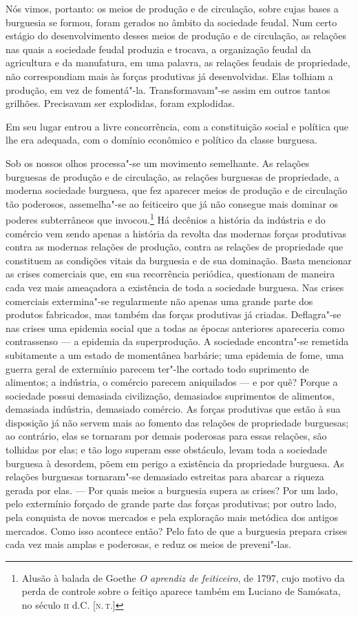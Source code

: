 Nós vimos, portanto: os meios de produção e de circulação, sobre cujas
bases a burguesia se formou, foram gerados no âmbito da sociedade
feudal. Num certo estágio do desenvolvimento desses meios de produção e
de circulação, as relações nas quais a sociedade feudal produzia e
trocava, a organização feudal da agricultura e da manufatura, em uma
palavra, as relações feudais de propriedade, não correspondiam mais às
forças produtivas já desenvolvidas. Elas tolhiam a produção, em vez de
fomentá"-la. Transformavam"-se assim em outros tantos grilhões.
Precisavam ser explodidas, foram explodidas.

Em seu lugar entrou a livre concorrência, com a constituição social e
política que lhe era adequada, com o domínio econômico e político da
classe burguesa.

Sob os nossos olhos processa"-se um movimento semelhante. As relações
burguesas de produção e de circulação, as relações burguesas de
propriedade, a moderna sociedade burguesa, que fez aparecer meios de
produção e de circulação tão poderosos, assemelha"-se ao feiticeiro
que já não consegue mais dominar os poderes subterrâneos que invocou.\footnote{Alusão à balada de Goethe \textit{O aprendiz de feiticeiro}, de 1797, cujo motivo da perda de controle sobre o feitiço aparece também em Luciano de Samósata, no século \textsc{ii} d.C. [\textsc{n.\,t.}]}
Há decênios a história da indústria e do comércio vem sendo apenas a
história da revolta das modernas forças produtivas contra as modernas
relações de produção, contra as relações de propriedade que constituem
as condições vitais da burguesia e de sua dominação. Basta mencionar as
crises comerciais que, em sua recorrência periódica, questionam de
maneira cada vez mais ameaçadora a existência de toda a sociedade
burguesa. Nas crises comerciais extermina"-se regularmente não apenas
uma grande parte dos produtos fabricados, mas também das forças
produtivas já criadas. Deflagra"-se nas crises uma epidemia social que
a todas as épocas anteriores apareceria como contrassenso  ---  a
epidemia da superprodução. A sociedade encontra"-se remetida
subitamente a um estado de momentânea barbárie; uma epidemia de fome,
uma guerra geral de extermínio parecem ter"-lhe cortado todo
suprimento de alimentos; a indústria, o comércio parecem aniquilados  --- 
e por quê? Porque a sociedade possui demasiada civilização, demasiados
suprimentos de alimentos, demasiada indústria, demasiado comércio. As
forças produtivas que estão à sua disposição já não servem mais ao
fomento das relações de propriedade burguesas; ao contrário, elas se
tornaram por demais poderosas para essas relações, são tolhidas por
elas; e tão logo superam esse obstáculo, levam toda a sociedade
burguesa à desordem, põem em perigo a existência da propriedade
burguesa. As relações burguesas tornaram"-se demasiado estreitas para
abarcar a riqueza gerada por elas. --- Por quais meios a burguesia supera    \label{9}
as crises? Por um lado, pelo extermínio forçado de grande parte das
forças produtivas; por outro lado, pela conquista de novos mercados e
pela exploração mais metódica dos antigos mercados. Como isso acontece
então? Pelo fato de que a burguesia prepara crises cada vez mais amplas
e poderosas, e reduz os meios de preveni"-las.

